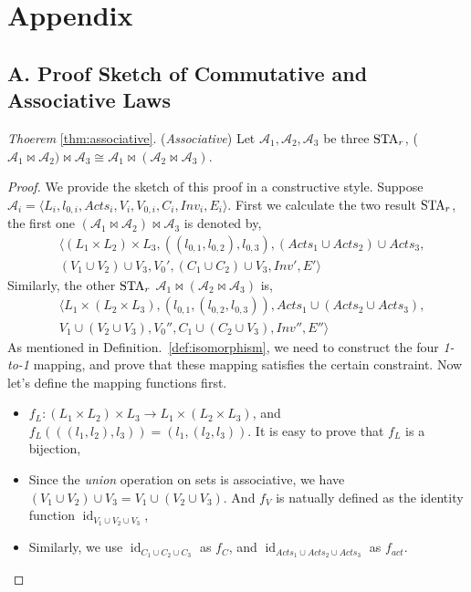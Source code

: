 \clearpage
\section*{Appendix}
\subsection*{A. Proof Sketch of Commutative and Associative Laws}

\noindent\emph{Thoerem} \ref{thm:associative}. (\emph{Associative})
Let $\mathscr{A}_1, \mathscr{A}_2, \mathscr{A}_3$ be three $\mbox{STA}_r$, ($\mathscr{A}_{1}\bowtie \mathscr{A}_{2})\bowtie \mathscr{A}_{3}\cong\mathscr{A}_{1}\bowtie(\mathscr{A}_{2}\bowtie \mathscr{A}_{3})$.

\begin{proof}
We provide the sketch of this proof in a constructive style. Suppose $\mathscr{A}_i=\langle L_{i}, l_{0,i}, Acts_{i}, V_{i}, V_{0,i}, C_{i}, Inv_{i}, E_{i}\rangle$. First we calculate the two result $\mbox{STA}_r$, the first one $(\mathscr{A}_{1}\bowtie \mathscr{A}_{2})\bowtie \mathscr{A}_{3}$ is denoted by,
\begin{eqnarray*}
    & \langle
        (L_1\times L_2)\times L_3, ((l_{0,1}, l_{0,2}), l_{0,3}),
        (Acts_1\cup Acts_2)\cup Acts_3, \\
        & (V_1\cup V_2)\cup V_3,
        V_0',
        (C_1\cup C_2)\cup V_3,
        Inv', E'
    \rangle
\end{eqnarray*}
Similarly, the other $\mbox{STA}_r$ $\mathscr{A}_{1}\bowtie(\mathscr{A}_{2}\bowtie \mathscr{A}_{3})$ is,
\begin{eqnarray*}
    & \langle
        L_1\times (L_2\times L_3), (l_{0,1}, (l_{0,2}, l_{0,3})),
        Acts_1\cup(Acts_2\cup Acts_3), \\
        & V_1\cup(V_2\cup V_3),
        V_0'',
        C_1\cup (C_2\cup V_3),
        Inv'', E''
    \rangle
\end{eqnarray*}
As mentioned in Definition.~\ref{def:isomorphism}, we need to construct the four \emph{1-to-1} mapping, and prove that these mapping satisfies the certain constraint. Now let's define the mapping functions first.

\begin{itemize}
    \item $f_L:(L_1\times L_2)\times L_3\rightarrow L_1\times (L_2\times L_3)$, and $f_L(((l_1,l_2), l_3))=(l_1,(l_2,l_3))$. It is easy to prove that $f_L$ is a bijection,
    \item Since the \emph{union} operation on sets is associative, we have $(V_1\cup V_2)\cup V_3=V_1\cup(V_2\cup V_3)$. And $f_V$ is natually defined as the identity function $\operatorname{id}_{V_1\cup V_2\cup V_3}$,
    \item Similarly, we use $\operatorname{id}_{C_1\cup C_2\cup C_3}$ as $f_C$, and $\operatorname{id}_{Acts_1\cup Acts_2\cup Acts_3}$ as $f_{act}$.
\end{itemize}


\end{proof}
